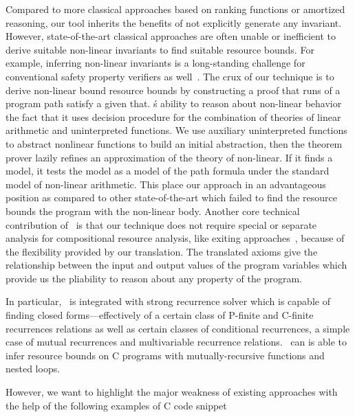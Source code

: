 Compared to more classical approaches based on ranking functions or amortized reasoning, our tool inherits the benefits of not explicitly generate any invariant.
However, state-of-the-art classical approaches are often unable or inefficient to derive suitable non-linear invariants to find suitable resource bounds. For example, inferring non-linear invariants is a long-standing challenge for conventional safety property verifiers as well~\cite{ball2001automatic,mcmillan2006lazy}. The crux of our technique is to derive non-linear bound resource bounds by constructing a proof that runs of a program path satisfy a given that. \SystemName\'s ability to
reason about non-linear behavior the fact that it uses decision procedure for the
combination of theories of linear arithmetic and uninterpreted functions. We use auxiliary uninterpreted functions to abstract nonlinear functions to build an initial abstraction, then the theorem
prover lazily refines an approximation of the theory of non-linear. If it finds a model, it tests the model as
a model of the path formula under the standard model of non-linear
arithmetic. This place our approach in an advantageous position as compared to other state-of-the-art which failed to find the resource bounds the program with the non-linear body. Another core technical contribution of \SystemName\ is that our technique does not require special or separate analysis for compositional resource
analysis, like exiting approaches~\cite{Carbonneaux:2015:CCR:2737924.2737955}, because of the flexibility provided by our translation. The translated axioms give the relationship between the input and output values of the program variables which provide us the pliability to reason about any property of the program.

In particular, \SystemName\ is integrated with strong recurrence solver which is capable of finding closed forms—effectively of a certain class of P-finite and C-finite recurrences relations as well as certain classes of conditional
recurrences, a simple case of mutual recurrences and multivariable recurrence relations.  \SystemName\ can is able to infer resource bounds on C programs with mutually-recursive functions and nested loops.


However, we want to highlight the major weakness of existing approaches with the help of the following examples of C code snippet

